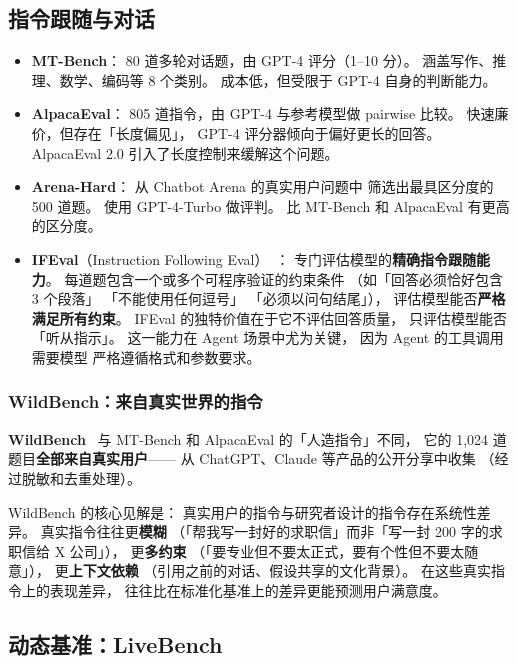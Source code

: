\subsection{指令跟随与对话}
\begin{itemize}[noitemsep]
  \item \textbf{MT-Bench}：
        80 道多轮对话题，由 GPT-4 评分（1--10 分）。
        涵盖写作、推理、数学、编码等 8 个类别。
        成本低，但受限于 GPT-4 自身的判断能力。
  \item \textbf{AlpacaEval}：
        805 道指令，由 GPT-4 与参考模型做 pairwise 比较。
        快速廉价，但存在「长度偏见」，
        GPT-4 评分器倾向于偏好更长的回答。
        AlpacaEval 2.0 引入了长度控制来缓解这个问题。
  \item \textbf{Arena-Hard}：
        从 Chatbot Arena 的真实用户问题中
        筛选出最具区分度的 500 道题。
        使用 GPT-4-Turbo 做评判。
        比 MT-Bench 和 AlpacaEval 有更高的区分度。
  \item \textbf{IFEval}（Instruction Following Eval）~\cite{zhou2023ifeval}：
        专门评估模型的\textbf{精确指令跟随能力}。
        每道题包含一个或多个可程序验证的约束条件
        （如「回答必须恰好包含 3 个段落」
        「不能使用任何逗号」
        「必须以问句结尾」），
        评估模型能否\textbf{严格满足所有约束}。
        IFEval 的独特价值在于它不评估回答质量，
        只评估模型能否「听从指示」。
        这一能力在 Agent 场景中尤为关键，
        因为 Agent 的工具调用需要模型
        严格遵循格式和参数要求。
\end{itemize}

\subsubsection{WildBench：来自真实世界的指令}

\textbf{WildBench}~\cite{lin2024wildbench}
与 MT-Bench 和 AlpacaEval 的「人造指令」不同，
它的 1,024 道题目\textbf{全部来自真实用户}——
从 ChatGPT、Claude 等产品的公开分享中收集
（经过脱敏和去重处理）。

WildBench 的核心见解是：
真实用户的指令与研究者设计的指令存在系统性差异。
真实指令往往更\textbf{模糊}
（「帮我写一封好的求职信」而非「写一封 200 字的求职信给 X 公司」），
更\textbf{多约束}
（「要专业但不要太正式，要有个性但不要太随意」），
更\textbf{上下文依赖}
（引用之前的对话、假设共享的文化背景）。
在这些真实指令上的表现差异，
往往比在标准化基准上的差异更能预测用户满意度。

\subsection{动态基准：LiveBench}

